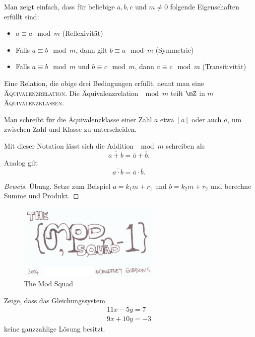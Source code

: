 \documentclass[%
11pt,%
twoside,%
titlepage,%
german,%
headsepline%
]{scrartcl}
\begin{document}
Man zeigt einfach, dass für beliebige $a,b,c$ und $m\neq0$ folgende Eigenschaften erfüllt sind:
\begin{itemize}
\item $a\equiv a\mod m$ (Reflexivität)
\item Falls $a\equiv b\mod m$, dann gilt $b\equiv a\mod m$ (Symmetrie)
\item Falls $a\equiv b\mod m$ und $b\equiv c\mod m$, dann $a\equiv c\mod m$ (Transitivität)
\end{itemize}

\begin{cdef}[Äquivalenzrelation]{}
Eine Relation, die obige drei Bedingungen erfüllt, nennt man eine \textsc{Äquivalenzrelation}. Die Äquivalenzrelation $\mod m$ teilt $\mZ$ in $m$ \textsc{Äquivalenzklassen}.
\end{cdef}

Man schreibt für die Äquivalenzklasse
einer Zahl $a$ etwa $[a]$ oder auch $\overline{a}$, um zwischen Zahl und Klasse zu unterscheiden.

Mit dieser Notation lässt sich die Addition $\mod m$ schreiben als
$$\overline{a+b}=\overline{a}+\overline{b}.$$
Analog gilt
$$\overline{a\cdot b}=\overline{a}\cdot\overline{b}.$$

\begin{proof}[Beweis]
Übung. Setze zum Beispiel $a=k_1m+r_1$ und $b=k_2m+r_2$ und berechne Summe und Produkt.
\end{proof}

\begin{figure}
\begin{center}
\includegraphics[width=0.618\textwidth]{pictures/modsquad}
\end{center}
\caption{The Mod Squad}
\end{figure}

\begin{ueb}[GlSys]
Zeige, dass das Gleichungssystem
\begin{align}
11x-5y=7\\
9x+10y=-3
\end{align}
keine ganzzahlige Lösung besitzt.
\end{ueb}
\end{document}
